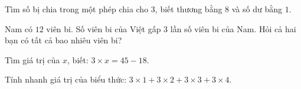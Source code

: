 \begin{ex} %
Tìm số bị chia trong một phép chia cho $3$, biết thương bằng $8$ và số dư bằng $1$.
\end{ex}

\begin{ex} %
Nam có $12$ viên bi. Số viên bi của Việt gấp $3$ lần số viên bi của Nam. Hỏi cả hai bạn có tất cả bao nhiêu viên bi?
\end{ex}

\begin{ex} %
Tìm giá trị của $x$, biết: $3 \times x = 45 - 18$.
\end{ex}

\begin{ex} %
Tính nhanh giá trị của biểu thức: $3 \times 1 + 3 \times 2 + 3 \times 3 + 3 \times 4$.
\end{ex}
